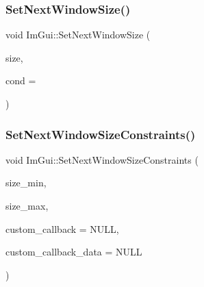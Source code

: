 \mbox{\label{namespace_im_gui_ab33717bb71ef5e393ae18656fc6b229d}} 
\subsubsection{\texorpdfstring{Set\+Next\+Window\+Size()}{SetNextWindowSize()}}
{\footnotesize\ttfamily void Im\+Gui\+::\+Set\+Next\+Window\+Size (\begin{DoxyParamCaption}\item[{const \mbox{\hyperlink{struct_im_vec2}{Im\+Vec2}} \&}]{size,  }\item[{\mbox{\hyperlink{imgui_8h_aef890d6ac872e12c5804d0b3e4f7f103}{Im\+Gui\+Cond}}}]{cond = {} }\end{DoxyParamCaption})}

\mbox{\label{namespace_im_gui_a06f40aaf9cf2539c8dba43156a131e45}} 
\subsubsection{\texorpdfstring{Set\+Next\+Window\+Size\+Constraints()}{SetNextWindowSizeConstraints()}}
{\footnotesize\ttfamily void Im\+Gui\+::\+Set\+Next\+Window\+Size\+Constraints (\begin{DoxyParamCaption}\item[{const \mbox{\hyperlink{struct_im_vec2}{Im\+Vec2}} \&}]{size\+\_\+min,  }\item[{const \mbox{\hyperlink{struct_im_vec2}{Im\+Vec2}} \&}]{size\+\_\+max,  }\item[{\mbox{\hyperlink{imgui_8h_abc6351d68ee31882cbb95d2b3d835cae}{Im\+Gui\+Size\+Constraint\+Callback}}}]{custom\+\_\+callback = {\ttfamily NULL},  }\item[{void $\ast$}]{custom\+\_\+callback\+\_\+data = {\ttfamily NULL} }\end{DoxyParamCaption})}

\mbox{\label{namespace_im_gui_a57d8e9497ad39584ba740cef70b78fb4}} 
